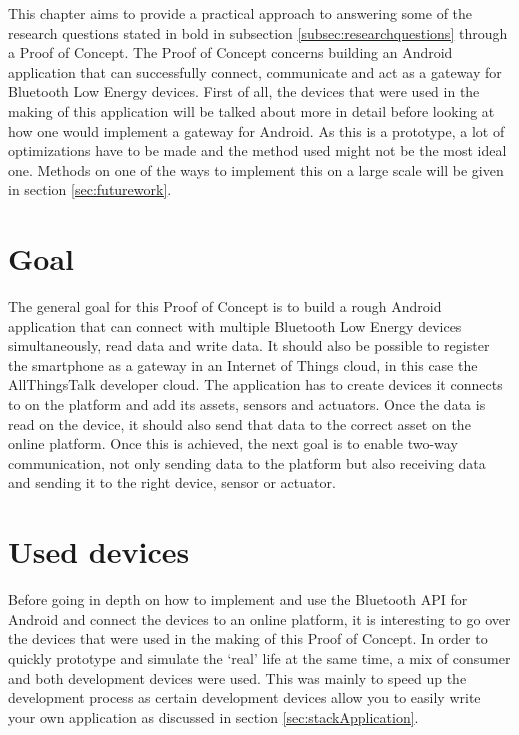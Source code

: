 \documentclass[pdftex,a4paper,12pt,twoside]{report}
\begin{document}
This chapter aims to provide a practical approach to answering some of the research questions stated in bold in subsection \ref{subsec:researchquestions} through a Proof of Concept. The Proof of Concept concerns building an Android application that can successfully connect, communicate and act as a gateway for Bluetooth Low Energy devices. First of all, the devices that were used in the making of this application will be talked about more in detail before looking at how one would implement a gateway for Android. As this is a prototype, a lot of optimizations have to be made and the method used might not be the most ideal one. Methods on one of the ways to implement this on a large scale will be given in section \ref{sec:futurework}.

\newpage{}

\section{Goal}
\label{sec:pocgoal}
The general goal for this Proof of Concept is to build a rough Android application that can connect with multiple Bluetooth Low Energy devices simultaneously, read data and write data. It should also be possible to register the smartphone as a gateway in an Internet of Things cloud, in this case the AllThingsTalk developer cloud. The application has to create devices it connects to on the platform and add its assets, sensors and actuators. Once the data is read on the device, it should also send that data to the correct asset on the online platform. Once this is achieved, the next goal is to enable two-way communication, not only sending data to the platform but also receiving data and sending it to the right device, sensor or actuator.

\section{Used devices}
\label{sec:devices}
Before going in depth on how to implement and use the Bluetooth API for Android and connect the devices to an online platform, it is interesting to go over the devices that were used in the making of this Proof of Concept. In order to quickly prototype and simulate the `real' life at the same time, a mix of consumer and both development devices were used. This was mainly to speed up the development process as certain development devices allow you to easily write your own application as discussed in section \ref{sec:stackApplication}.
\end{document}
